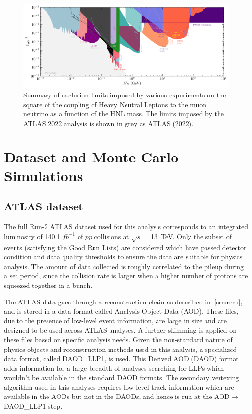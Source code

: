 \begin{figure}[!ht]
    \centering
    \includegraphics[width=1\linewidth]{figures/analysis_overview/HNL_summary_mu.png}
    \caption{Summary of exclusion limits imposed by various experiments on the square of the coupling of Heavy Neutral Leptons to the muon neutrino as a function of the HNL mass. The limits imposed by the ATLAS 2022 analysis is shown in grey as ATLAS (2022).~\cite{Fernandez-Martinez:2023phj}}
    \label{fig:HNL-summ-mu}
\end{figure}

\section{Dataset and Monte Carlo Simulations}\label{sec:data_mc_samples}
\subsection{ATLAS dataset}
The full Run-2 ATLAS dataset used for this analysis corresponds to an integrated luminosity of 140.1 $fb^{-1}$ of $pp$ collisions at $\sqrt{s}=$13~TeV. Only the subset of events (satisfying the Good Run Lists) are considered which have passed detector condition and data quality thresholds to ensure the data are suitable for physics analysis. The amount of data collected is roughly correlated to the pileup during a set period, since the collision rate is larger when a higher number of protons are squeezed together in a bunch.

The ATLAS data goes through a reconstruction chain as described in~\cref{sec:reco}, and is stored in a data format called Analysis Object Data (AOD). These files, due to the presence of low-level event information, are large in size and are designed to be used across ATLAS analyses. A further skimming is applied on these files based on specific analysis needs.
Given the non-standard nature of physics objects and reconstruction methods used in this analysis, a specialized data format, called DAOD\_LLP1, is used. This Derived AOD (DAOD) format adds information for a large breadth of analyses searching for LLPs which wouldn't be available in the standard DAOD formats. The secondary vertexing algorithm used in this analyses requires low-level track information which are available in the AODs but not in the DAODs, and hence is run at the AOD$\rightarrow$DAOD\_LLP1 step. 

